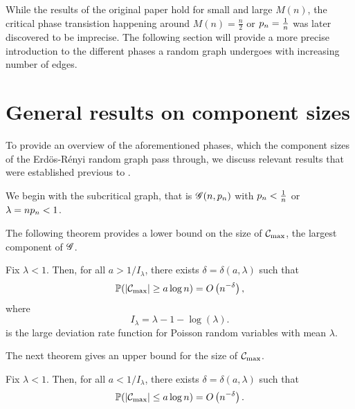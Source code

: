 While the results of the original paper hold for small and large $M(n)$,
the critical phase transistion happening around $M(n) = \frac{n}{2}$ or $p_n = \frac{1}{n}$
was later discovered to be imprecise.
The following section will provide a more precise introduction to the different phases a random graph undergoes
with increasing number of edges.


\section{General results on component sizes}

To provide an overview of the aforementioned phases, 
which the component sizes of the Erdös-Rényi random graph pass through,
we discuss relevant results that were established previous to \cite{Aldous.1997}.

We begin with the subcritical graph, that is
$\mathscr{G}(n, p_n)$ with $p_n < \frac{1}{n}$
or $\lambda = n p_n < 1$.

The following theorem provides a lower bound on the size of $\mathcal{C}_{\max}$, the largest component of $\mathscr{G}$.
\begin{theorem}
	Fix $\lambda < 1$. 
	Then, for all $a > 1/I_{\lambda}$, 
	there exists $\delta = \delta(a, \lambda)$ such that
	\begin{equation}
		\mathbb{P}( |\mathcal{C}_{\max}| \geq a \log n ) = O\left(n^{-\delta}\right),
	\end{equation}
	where 
	\begin{equation}
		I_{\lambda} = \lambda - 1 - \log(\lambda).
	\end{equation}
	is the large deviation rate function for Poisson random variables with mean $\lambda$.
\end{theorem}

The next theorem gives an upper bound for the size of $\mathcal{C}_{\max}$.
\begin{theorem}
	Fix $\lambda < 1$. 
	Then, for all $a < 1/I_{\lambda}$, 
	there exists $\delta = \delta(a, \lambda)$ such that
	\begin{equation}
	\mathbb{P}( |\mathcal{C}_{\max}| \leq a \log n ) = O\left(n^{-\delta}\right).
	\end{equation}
\end{theorem}

